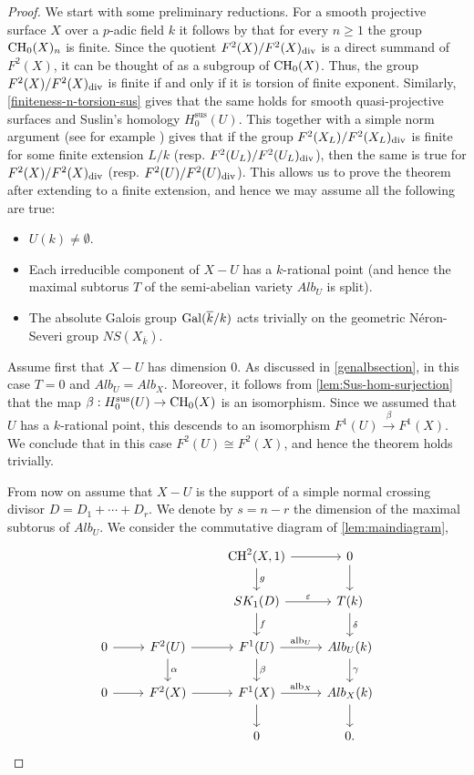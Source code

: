 \documentclass[12pt]{amsart}
\theoremstyle{remark}
\renewcommand{\1}{{\mathbb{S}}}
\newcommand{\alb}{{\rm alb}}
\newcommand{\CH}{{\rm CH}}
\newcommand{\Gal}{{\rm Gal}}
\newcommand{\<}{\langle}
\renewcommand{\>}{\rangle}
\newcommand{\Sus}{{\operatorname{sus}}}
\newcommand{\dv}{{\rm div}}
\begin{document}
 \begin{proof} We start with some preliminary reductions. 
For a smooth projective surface $X$ over a $p$-adic field $k$ it follows by \cite[Theorem 8.1]{CT1} that for every $n\geq 1$ the  group $\CH_0(X)_n$ is finite. Since the quotient $F^2(X)/F^2(X)_{\dv}$ is a direct summand of $F^2(X)$, it can be thought of as a subgroup of $\CH_0(X)$. Thus,  the group $F^2(X)/F^2(X)_{\dv}$ is finite if and only if it is torsion of  finite exponent. Similarly,  \autoref{finiteness-n-torsion-sus} gives that the same holds for smooth quasi-projective surfaces and Suslin's homology $H_0^{\Sus}(U)$. This together with a simple norm argument (see for example \cite[Lemma 3.3]{Gaz24}) gives that if the group $F^2(X_L)/F^2(X_L)_{\dv}$ is finite for some finite extension $L/k$ (resp. $F^2(U_L)/F^2(U_L)_{\dv}$), then the same is true for $F^2(X)/F^2(X)_{\dv}$ (resp. $F^2(U)/F^2(U)_{\dv}$). This allows us to prove the theorem after extending to a finite extension, 
and hence we may assume all the following are true: 
\begin{itemize}
\item $U(k)\neq\emptyset$.
\item Each irreducible component of $X-U$ has a $k$-rational point (and hence the maximal subtorus $T$ of the semi-abelian variety $Alb_U$ is split). 
\item The absolute Galois group $\Gal(\overline{k}/k)$ acts trivially on the geometric N\'{e}ron-Severi group $NS(X_{\overline{k}})$. 
\end{itemize}

Assume first that $X-U$ has dimension $0$. As discussed in \autoref{genalbsection}, in this case $T=0$ and $Alb_U=Alb_X$.
Moreover, it follows from \autoref{lem:Sus-hom-surjection} that the map $\beta:H_0^{\Sus}(U)\to \CH_0(X)$ is an isomorphism. Since we assumed that $U$ has a $k$-rational point, this descends to an isomorphism $F^1(U)\xrightarrow{\beta} F^1(X)$. 
We conclude that in this case $F^2(U) \cong F^2(X)$, and hence the theorem holds trivially. 

From now on assume that $X-U$ is the support of a simple normal crossing divisor $D=D_1+\cdots+D_r$. We denote by $s=n-r$ the dimension of the maximal subtorus of $Alb_U$. We consider the commutative diagram of \autoref{lem:maindiagram}, 
 \[
\begin{tikzcd}
&     & \CH^2(X,1) \arrow[r] \arrow[d, "g"] & 0 \arrow[d] \\
&     & SK_1(D) \arrow[r, "\varepsilon"] \arrow[d, "f"] & T(k) \arrow[d, "\delta"] \\
	0 \arrow[r] & F^{2}(U) \arrow[r] \arrow[d, "\alpha"] & F^{1}(U) \arrow[r, "\alb_U"] \arrow[d, "\beta"] & Alb_{U}(k) \arrow[d, "\gamma"] \\
	0 \arrow[r] & F^{2}(X) \arrow[r]                 & F^1(X)  \arrow[r, "\alb_X"]    \arrow[d]             & Alb_{X}(k) \arrow[d] \\
	 &                  & 0   & 0.
\end{tikzcd}
\]  


\end{proof}
\end{document}
